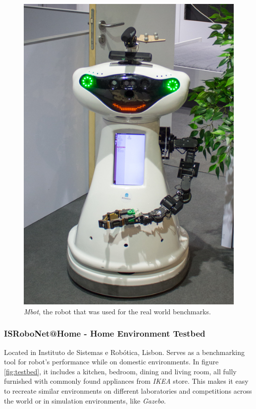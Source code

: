 \begin{figure}[H]
    \centering
        \includegraphics[scale=0.3]{images/mbot}
        \caption{\textit{Mbot}, the robot that was used for the real world benchmarks.}
        \label{fig:mbot}
\end{figure}

\subsubsection{ISRoboNet@Home - Home Environment Testbed}
Located in Instituto de Sistemas e Robótica, Lisbon. 
Serves as a benchmarking tool for robot's performance while on domestic environments. 
In figure \ref{fig:testbed}, it includes a kitchen, bedroom, dining and living room, all
fully furnished with commonly found appliances from \textit{IKEA} store. This
makes it easy to recreate similar environments on different laboratories and
competitions across the world or in simulation environments, like \textit{Gazebo}.

